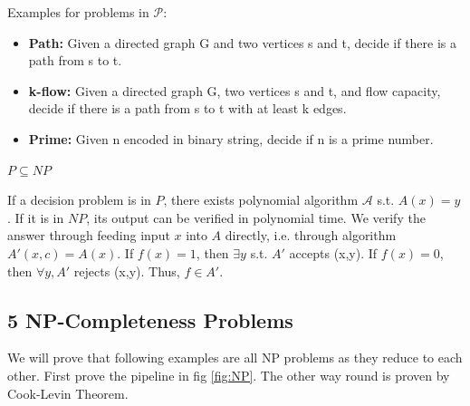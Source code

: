 Examples for problems in $\mathcal{P}$:
\begin{itemize}
    \item \textbf{Path:} Given a directed graph G and two vertices s and t, decide if there is a path from s to t.
    \item \textbf{k-flow:} Given a directed graph G, two vertices s and t, and flow capacity, decide if there is a path from s to t with at least k edges.
    \item \textbf{Prime:} Given n encoded in binary string, decide if n is a prime number.
\end{itemize}

\begin{prf}$P\subseteq NP$

If a decision problem is in $P$, there exists polynomial algorithm $\mathcal{A}$ s.t. $A(x)=y$. If it is in $NP$, its output can be verified in polynomial time. We verify the answer through feeding input $x$ into $A$ directly, i.e. through algorithm $A'(x,c)=A(x)$.  If $f(x)=1$, then $\exists y$ s.t. $A'$ accepts (x,y). If $f(x)=0$, then $\forall y, A'$ rejects (x,y). Thus, $f \in A'$.
\end{prf}

\subsection{5 NP-Completeness Problems}
We will prove that following examples are all NP problems as they reduce to each other.
First prove the pipeline in fig \ref{fig:NP}. The other way round is proven by Cook-Levin Theorem.

